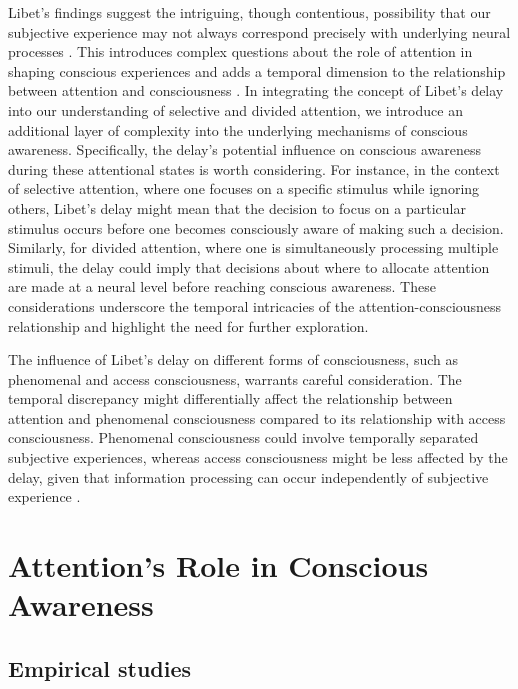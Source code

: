\documentclass[10pt]{article}
\begin{document}
\begin{sloppypar}
  Libet's findings suggest the intriguing, though contentious, possibility that our subjective experience may not always correspond precisely with underlying neural processes \citep{dennett_elbow_1984, mele_effective_2006}. This introduces complex questions about the role of attention in shaping conscious experiences and adds a temporal dimension to the relationship between attention and consciousness \citep{dijksterhuis_goals_2010}. In integrating the concept of Libet's delay into our understanding of selective and divided attention, we introduce an additional layer of complexity into the underlying mechanisms of conscious awareness. Specifically, the delay's potential influence on conscious awareness during these attentional states is worth considering. For instance, in the context of selective attention, where one focuses on a specific stimulus while ignoring others, Libet's delay might mean that the decision to focus on a particular stimulus occurs before one becomes consciously aware of making such a decision. Similarly, for divided attention, where one is simultaneously processing multiple stimuli, the delay could imply that decisions about where to allocate attention are made at a neural level before reaching conscious awareness. These considerations underscore the temporal intricacies of the attention-consciousness relationship and highlight the need for further exploration.

  The influence of Libet’s delay on different forms of consciousness, such as phenomenal and access consciousness, warrants careful consideration. The temporal discrepancy might differentially affect the relationship between attention and phenomenal consciousness compared to its relationship with access consciousness. Phenomenal consciousness could involve temporally separated subjective experiences, whereas access consciousness might be less affected by the delay, given that information processing can occur independently of subjective experience \citep{dijksterhuis_goals_2010, kozuch_gorillas_2018}.

  \section{Attention’s Role in Conscious Awareness}
  \label{sec:evidence}

  \subsection{Empirical studies}
  \label{sec:empirical}


\end{sloppypar}
\end{document}
